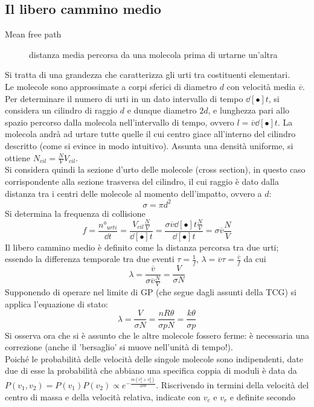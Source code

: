 \documentclass[10pt, oneside]{book}
\newcommand{\ds}{\displaystyle}
\begin{document}
\subsection{Il libero cammino medio}
\begin{description}
\item[Mean free path] distanza media percorsa da una molecola prima di urtarne un'altra
\end{description}
Si tratta di una grandezza che caratterizza gli urti tra costituenti elementari.\\
Le molecole sono approssimate a corpi sferici di diametro $d$ con velocità media $\overline{v}$.\\
Per determinare il numero di urti in un dato intervallo di tempo $\dd[•]{t}$, si considera un cilindro di raggio $d$ e dunque diametro $2d$, e lunghezza pari allo spazio percorso dalla molecola nell'intervallo di tempo, ovvero $l = \overline{v} \dd[•]{t}$. La molecola andrà ad urtare tutte quelle il cui centro giace all'interno del cilindro descritto (come si evince in modo intuitivo). Assunta una densità uniforme, si ottiene $\ds N_{cil} = \frac{N}{V} V_{cil}$.\\
Si considera quindi la sezione d'urto delle molecole (cross section), in questo caso corrispondente alla sezione trasversa del cilindro, il cui raggio è dato dalla distanza tra i centri delle molecole al momento dell'impatto, ovvero a $d$:
\[\sigma = \pi d^2\]
Si determina la frequenza di collisione
\[f = \frac{n°_{urti}}{\dd{t}} = \frac{V_{cil} \frac{N}{V}}{\dd[•]{t}} = \frac{\sigma \overline{v} \dd[•]{t} \frac{N}{V}}{\dd[•]{t}}= \sigma \overline{v} \frac{N}{V}\]
Il libero cammino medio è definito come la distanza percorsa tra due urti; essendo la differenza temporale tra due eventi $\ds \tau = \frac{1}{f}$, $\ds \lambda = \overline{v} \tau = \frac{\overline{v}}{f}$ da cui
\[\lambda = \frac{\overline{v}}{\sigma \overline{v} \frac{N}{V}} = \frac{V}{\sigma N}\]
Supponendo di operare nel limite di GP (che segue dagli assunti della TCG) si applica l'equazione di stato:
\[\lambda = \frac{V}{\sigma N} = \frac{n R \theta}{\sigma p N} = \frac{k \theta}{\sigma p}\]
Si osserva ora che si è assunto che le altre molecole fossero ferme: è necessaria una correzione (anche il 'bersaglio' si muove nell'unità di tempo!).\\
Poiché le probabilità delle velocità delle singole molecole sono indipendenti, date due di esse la probabilità che abbiano una specifica coppia di moduli è data da $\ds P(v_1, v_2) = P(v_1) P(v_2) \propto e^{\displaystyle - \frac{m(v_1^2 + v_2^2)}{2k \theta}}$. Riscrivendo in termini della velocità del centro di massa e della velocità relativa, indicate con $v_c$ e $v_r$ e definite secondo
\end{document}
